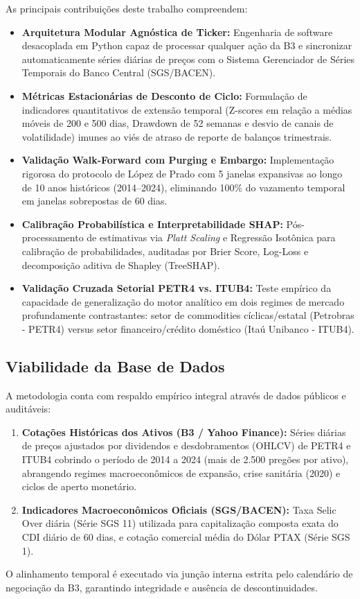 \documentclass[conference]{IEEEtran}
\begin{document}
As principais contribuições deste trabalho compreendem:
\begin{itemize}
    \item \textbf{Arquitetura Modular Agnóstica de Ticker:} Engenharia de software desacoplada em Python capaz de processar qualquer ação da B3 e sincronizar automaticamente séries diárias de preços com o Sistema Gerenciador de Séries Temporais do Banco Central (SGS/BACEN).
    \item \textbf{Métricas Estacionárias de Desconto de Ciclo:} Formulação de indicadores quantitativos de extensão temporal (Z-scores em relação a médias móveis de 200 e 500 dias, Drawdown de 52 semanas e desvio de canais de volatilidade) imunes ao viés de atraso de reporte de balanços trimestrais.
    \item \textbf{Validação Walk-Forward com Purging e Embargo:} Implementação rigorosa do protocolo de López de Prado \cite{deprado2018advances} com 5 janelas expansivas ao longo de 10 anos históricos (2014–2024), eliminando 100\% do vazamento temporal em janelas sobrepostas de 60 dias.
    \item \textbf{Calibração Probabilística e Interpretabilidade SHAP:} Pós-processamento de estimativas via \textit{Platt Scaling} e Regressão Isotônica para calibração de probabilidades, auditadas por Brier Score, Log-Loss e decomposição aditiva de Shapley (TreeSHAP).
    \item \textbf{Validação Cruzada Setorial PETR4 vs. ITUB4:} Teste empírico da capacidade de generalização do motor analítico em dois regimes de mercado profundamente contrastantes: setor de commodities cíclicas/estatal (Petrobras - PETR4) versus setor financeiro/crédito doméstico (Itaú Unibanco - ITUB4).
\end{itemize}

\subsection{Viabilidade da Base de Dados}
A metodologia conta com respaldo empírico integral através de dados públicos e auditáveis:
\begin{enumerate}
    \item \textbf{Cotações Históricas dos Ativos (B3 / Yahoo Finance):} Séries diárias de preços ajustados por dividendos e desdobramentos (OHLCV) de PETR4 e ITUB4 cobrindo o período de 2014 a 2024 (mais de 2.500 pregões por ativo), abrangendo regimes macroeconômicos de expansão, crise sanitária (2020) e ciclos de aperto monetário.
    \item \textbf{Indicadores Macroeconômicos Oficiais (SGS/BACEN):} Taxa Selic Over diária (Série SGS 11) utilizada para capitalização composta exata do CDI diário de 60 dias, e cotação comercial média do Dólar PTAX (Série SGS 1).
\end{enumerate}
O alinhamento temporal é executado via junção interna estrita pelo calendário de negociação da B3, garantindo integridade e ausência de descontinuidades.
\end{document}
